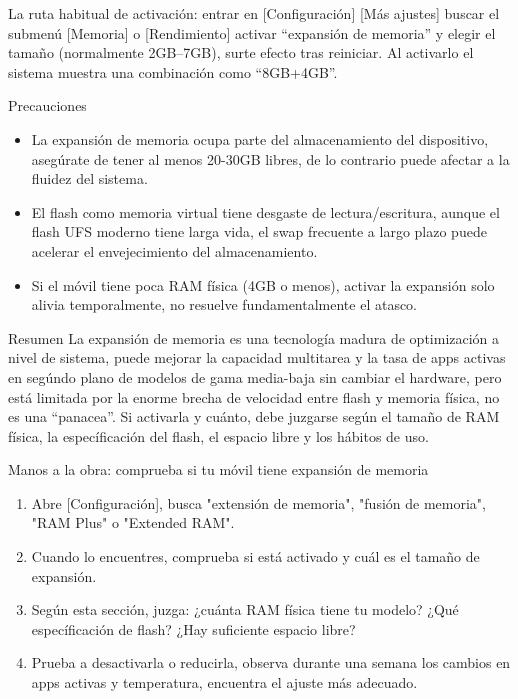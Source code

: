 La ruta habitual de activación: entrar en [Configuración] [Más ajustes] buscar el submenú [Memoria] o [Rendimiento] activar “expansión de memoria” y elegir el tamaño (normalmente 2GB–7GB), surte efecto tras reiniciar. Al activarlo el sistema muestra una combinación como “8GB+4GB”.

\begin{tcbwarn}{Precauciones}
\begin{itemize}
  \item La expansión de memoria ocupa parte del almacenamiento del dispositivo, asegúrate de tener al menos 20-30GB libres, de lo contrario puede afectar a la fluidez del sistema.
  \item El flash como memoria virtual tiene desgaste de lectura/escritura, aunque el flash UFS moderno tiene larga vida, el swap frecuente a largo plazo puede acelerar el envejecimiento del almacenamiento.
  \item Si el móvil tiene poca RAM física (4GB o menos), activar la expansión solo alivia temporalmente, no resuelve fundamentalmente el atasco.
\end{itemize}

\end{tcbwarn}

\begin{tcbinfo}{Resumen}
La expansión de memoria es una tecnología madura de optimización a nivel de sistema, puede mejorar la capacidad multitarea y la tasa de apps activas en segúndo plano de modelos de gama media-baja sin cambiar el hardware, pero está limitada por la enorme brecha de velocidad entre flash y memoria física, no es una “panacea”. Si activarla y cuánto, debe juzgarse según el tamaño de RAM física, la específicación del flash, el espacio libre y los hábitos de uso.

\end{tcbinfo}

\begin{tcbpractice}{Manos a la obra: comprueba si tu móvil tiene expansión de memoria}
\begin{enumerate}
  \item Abre [Configuración], busca "extensión de memoria", "fusión de memoria", "RAM Plus" o "Extended RAM".
  \item Cuando lo encuentres, comprueba si está activado y cuál es el tamaño de expansión.
  \item Según esta sección, juzga: ¿cuánta RAM física tiene tu modelo? ¿Qué específicación de flash? ¿Hay suficiente espacio libre?
  \item Prueba a desactivarla o reducirla, observa durante una semana los cambios en apps activas y temperatura, encuentra el ajuste más adecuado.
\end{enumerate}

\end{tcbpractice}
